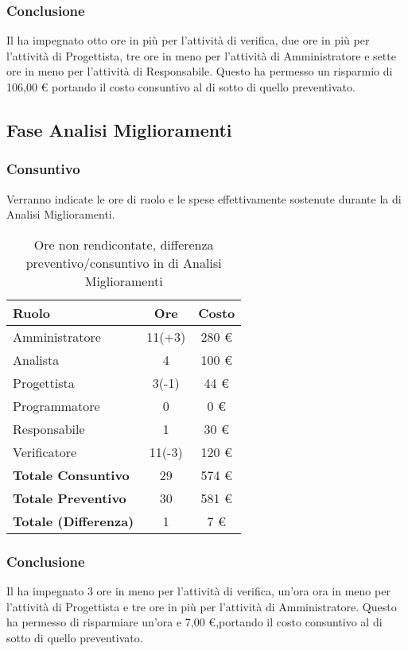 \subsubsection{Conclusione}
Il  ha impegnato otto ore in pi\`u per l'attivit\`a di verifica, due ore in pi\`u per l'attivit\`a di Progettista, tre ore in meno per l'attivit\`a di Amministratore e sette ore in meno per l'attivit\`a di Responsabile. Questo ha permesso un risparmio di 106,00 \euro{} portando il costo consuntivo al di sotto di quello preventivato.



\subsection{Fase Analisi Miglioramenti}
\subsubsection{Consuntivo}
Verranno indicate le ore di ruolo e le spese effettivamente sostenute durante la  di Analisi Miglioramenti.

\begin{table}[H]
	\centering
	\begin{tabular}{ l c c }
		\textbf{Ruolo} & \textbf{Ore} & \textbf{Costo} \\
		\hline
		Amministratore & 11(+3) & 280 \euro{} \\
		Analista & 4 & 100 \euro{} \\
		Progettista & 3(-1) & 44 \euro{} \\
		Programmatore & 0 & 0 \euro{} \\
		Responsabile & 1 & 30 \euro{} \\
		Verificatore & 11(-3) & 120 \euro{} \\
		\hline
		\textbf{Totale Consuntivo} & 29 & 574 \euro{} \\
		\hline
		\textbf{Totale Preventivo} & 30 & 581 \euro{} \\
		\hline
		\textbf{Totale (Differenza)} & 1 & 7 \euro{} \\
		\hline
	\end{tabular}
	\caption{Ore non rendicontate, differenza preventivo/consuntivo in  di Analisi Miglioramenti}
\end{table}



\subsubsection{Conclusione}
Il  ha impegnato 3 ore in meno per l'attivit\`a di verifica, un'ora ora in meno per l'attivit\`a di Progettista e tre ore in più per l'attivit\`a di Amministratore. Questo ha permesso di risparmiare un'ora e 7,00 \euro{},portando il costo consuntivo al di sotto di quello preventivato.
